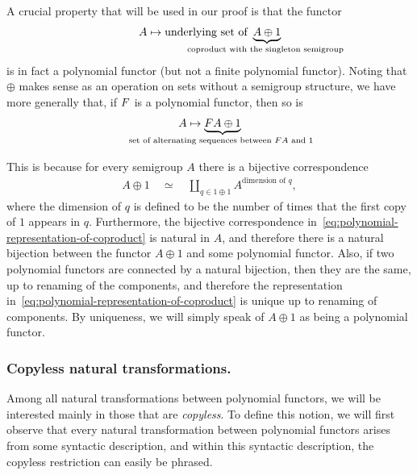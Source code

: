 \begin{example}\label{ex:coproduct-as-polynomial-functor}
    A crucial property that will be used in our proof is that the functor
    \begin{align*}
    A \mapsto \text{underlying set of}\ \myunderbrace{A \oplus 1}{\text{coproduct with the singleton semigroup}}
    \end{align*}
    is in fact a polynomial functor (but not a finite polynomial functor). Noting that $\oplus$ makes sense as an operation on sets without a semigroup structure, we have more generally that, if $\functor$ is a polynomial functor, then so is
    \begin{align*}
        A \mapsto \myunderbrace{\functor A \oplus 1}{\text{set of alternating sequences between $\functor A$ and $1$}}
    \end{align*}
    
    This is because for every semigroup $A$ there is a bijective correspondence 
    \begin{align}\label{eq:polynomial-representation-of-coproduct}
    A \oplus 1 \quad \simeq \quad \coprod_{q \in 1 \oplus 1} A^{\text{dimension of $q$}},
    \end{align}
    where the dimension of $q$ is defined to be the number of times that the first copy of $1$ appears in $q$. Furthermore, the bijective correspondence in~\eqref{eq:polynomial-representation-of-coproduct} is natural in $A$, and therefore there is a natural bijection between the functor $A \oplus 1$ and some polynomial functor. Also, if two polynomial functors are connected by a natural bijection, then they are the same, up to renaming of the components, and therefore the representation in~\eqref{eq:polynomial-representation-of-coproduct} is unique up to renaming of components. By uniqueness, we will simply speak of $A \oplus 1$ as being a polynomial functor. 
\end{example}




\subsubsection{Copyless natural transformations.}  Among all natural  transformations between polynomial functors, we will be interested mainly in those that are  \emph{copyless}. To define this notion, we will first observe that  every natural transformation between polynomial functors  arises from some syntactic description, and within this syntactic description, the copyless restriction can easily be phrased. 

